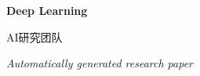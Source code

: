 \documentclass[12pt]{article}
\begin{document}
\begin{titlepage}
  \centering\vspace*{2cm}
  {\Huge\bfseries Deep Learning\par}\vspace{1.5cm}
  {\large AI研究团队\par}\vspace{0.5cm}{\large \today\par}\vfill
  {\large \textit{Automatically generated research paper}\par}
\end{titlepage}

\begin{abstract}
本论文围绕“Deep Learning”展开，汇总文献、阐述方法并给出讨论与结论。
\end{abstract}

\tableofcontents\newpage









\end{document}
